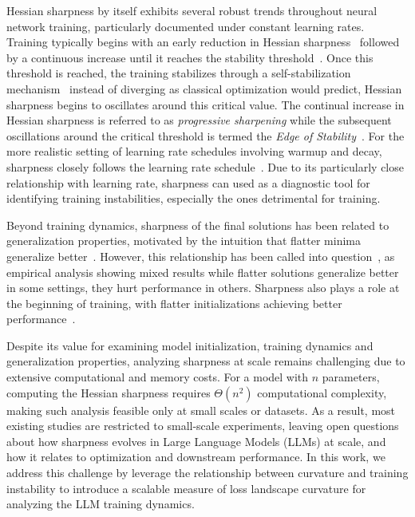 \documentclass[]{fairmeta}
\theoremstyle{plain}
\theoremstyle{definition}
\begin{document}
Hessian sharpness by itself exhibits several robust trends throughout neural network training, particularly documented under constant learning rates. 
Training typically begins with an early reduction in Hessian sharpness~\citep{kalra2023phase,kalra2025universal} followed by a continuous increase until it reaches the stability threshold~\citep{Jastrzebski2020The,cohen2021gradient}. 
Once this threshold is reached, the training stabilizes through a self-stabilization mechanism~\citep{damian2023selfstabilization,cohen2025understanding} \textemdash instead of diverging as classical optimization would predict, Hessian sharpness begins to oscillates around this critical value. The continual increase in Hessian sharpness is referred to as \emph{progressive sharpening} while the subsequent oscillations around the critical threshold is termed the \emph{Edge of Stability}~\citep{cohen2021gradient}.
For the more realistic setting of learning rate schedules involving warmup and decay, sharpness closely follows the learning rate schedule~\citep{gilmer2022a,kalra2023phase,cohen2021gradient}. Due to its particularly close relationship with learning rate, sharpness can used as a diagnostic tool for identifying training instabilities, especially the ones detrimental for training.


Beyond training dynamics, sharpness of the final solutions has been related to generalization properties, motivated by the intuition that flatter minima generalize better~\citep{Hochreiter1997FlatM}. However, this relationship has been called into question~\citep{pmlr-v187-kaur23a}, as empirical analysis showing mixed results \textemdash
while flatter solutions generalize better in some settings, they hurt performance in others. 
Sharpness also plays a role at the beginning of training, with flatter initializations achieving better performance~\citep{NEURIPS2019_876e8108,kalra2024why}.

Despite its value for examining model initialization, training dynamics and generalization properties, analyzing sharpness at scale remains challenging due to extensive computational and memory costs. 
For a model with $n$ parameters, computing the Hessian sharpness requires $\Theta(n^2)$ computational complexity, making such analysis feasible only at small scales or datasets.
As a result, most existing studies are restricted to small-scale experiments, leaving open questions about how sharpness evolves in Large Language Models (LLMs) at scale, and how it relates to optimization and downstream performance.
In this work, we address this challenge by leverage the relationship between curvature and training instability to introduce a scalable measure of loss landscape curvature for analyzing the LLM training dynamics.
\end{document}
